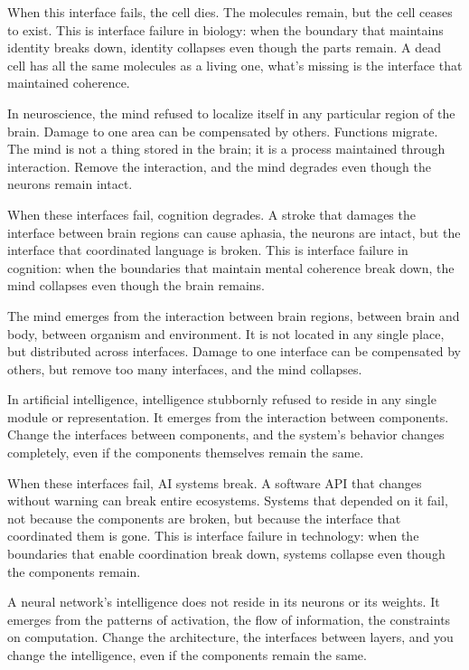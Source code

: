 \documentclass[
  openright]{book}
\begin{document}
When this interface fails, the cell dies. The molecules remain, but the
cell ceases to exist. This is interface failure in biology: when the
boundary that maintains identity breaks down, identity collapses even
though the parts remain. A dead cell has all the same molecules as a
living one, what's missing is the interface that maintained coherence.

In neuroscience, the mind refused to localize itself in any particular
region of the brain. Damage to one area can be compensated by others.
Functions migrate. The mind is not a thing stored in the brain; it is a
process maintained through interaction. Remove the interaction, and the
mind degrades even though the neurons remain intact.

When these interfaces fail, cognition degrades. A stroke that damages
the interface between brain regions can cause aphasia, the neurons are
intact, but the interface that coordinated language is broken. This is
interface failure in cognition: when the boundaries that maintain mental
coherence break down, the mind collapses even though the brain remains.

The mind emerges from the interaction between brain regions, between
brain and body, between organism and environment. It is not located in
any single place, but distributed across interfaces. Damage to one
interface can be compensated by others, but remove too many interfaces,
and the mind collapses.

In artificial intelligence, intelligence stubbornly refused to reside in
any single module or representation. It emerges from the interaction
between components. Change the interfaces between components, and the
system's behavior changes completely, even if the components themselves
remain the same.

When these interfaces fail, AI systems break. A software API that
changes without warning can break entire ecosystems. Systems that
depended on it fail, not because the components are broken, but because
the interface that coordinated them is gone. This is interface failure
in technology: when the boundaries that enable coordination break down,
systems collapse even though the components remain.

A neural network's intelligence does not reside in its neurons or its
weights. It emerges from the patterns of activation, the flow of
information, the constraints on computation. Change the architecture,
the interfaces between layers, and you change the intelligence, even if
the components remain the same.
\end{document}
